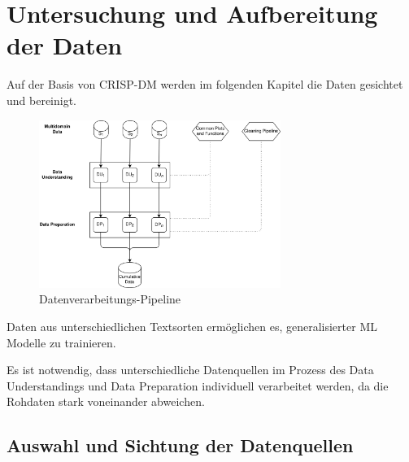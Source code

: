 
\chapter{Untersuchung und Aufbereitung der Daten} \label{ch:crispDm_1}

Auf der Basis von \ac{CRISP-DM} werden im folgenden Kapitel die Daten gesichtet und bereinigt.

\begin{figure}[H]
    \centering
    \includegraphics[width=0.7\textwidth]{data/images/data_flow_v2_1.png}
    \caption[Datenverarbeitungs-Pipeline]{Datenverarbeitungs-Pipeline} \label{fig:dataFlow_1}
\end{figure}


Daten aus unterschiedlichen Textsorten ermöglichen es, generalisierter \ac{ML} Modelle zu trainieren. 




Es ist notwendig, dass unterschiedliche Datenquellen im Prozess des Data Understandings und Data Preparation individuell verarbeitet werden, da die Rohdaten stark voneinander abweichen.

\section{Auswahl und Sichtung der Datenquellen} \label{sec:dataUnderstanding}

